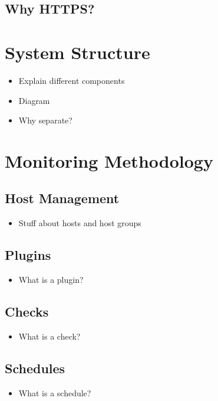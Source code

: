 \documentclass[bsc,logo,twoside]{infthesis}
\begin{document}
\subsection{Why HTTPS?}

\section{System Structure}
\begin{itemize}
	\item Explain different components
	\item Diagram
	\item Why separate?
\end{itemize}

\section{Monitoring Methodology}
\subsection{Host Management}
\begin{itemize}
	\item Stuff about hosts and host groups
\end{itemize}

\subsection{Plugins}
\begin{itemize}
	\item What is a plugin?
\end{itemize}

\subsection{Checks}
\begin{itemize}
	\item What is a check?
\end{itemize}

\subsection{Schedules}
\begin{itemize}
	\item What is a schedule?
\end{itemize}
\end{document}
